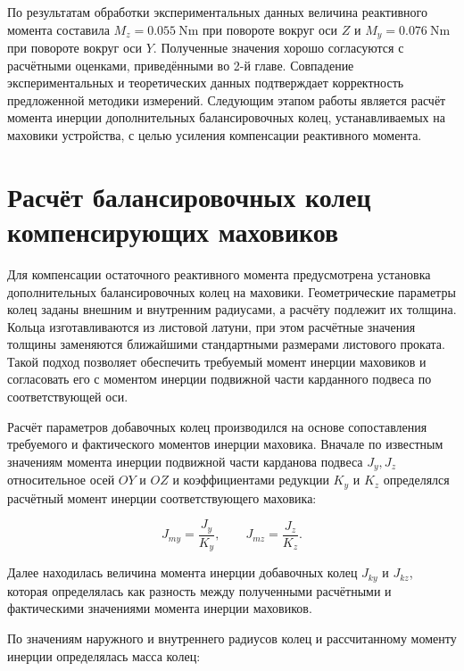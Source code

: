По результатам обработки экспериментальных данных величина реактивного момента составила $M_z = \SI{0,055}{\newton\meter}$ при повороте вокруг оси $Z$ и $M_y = \SI{0,076}{\newton\meter}$ при повороте вокруг оси $Y$. Полученные значения  хорошо согласуются с расчётными оценками, приведёнными во 2-й главе. Совпадение экспериментальных и теоретических данных подтверждает корректность предложенной методики измерений.
Следующим этапом работы является расчёт момента инерции дополнительных балансировочных колец, устанавливаемых на маховики устройства, с целью усиления компенсации реактивного момента.

\section{Расчёт балансировочных колец компенсирующих маховиков}



Для компенсации остаточного реактивного момента предусмотрена установка дополнительных балансировочных колец на маховики. Геометрические параметры колец заданы внешним и внутренним радиусами, а расчёту подлежит их толщина. Кольца изготавливаются из листовой латуни, при этом расчётные значения толщины заменяются ближайшими стандартными размерами листового проката. Такой подход позволяет обеспечить требуемый момент инерции маховиков и согласовать его с моментом инерции подвижной части карданного подвеса по соответствующей оси.




Расчёт параметров добавочных колец производился на основе сопоставления требуемого и фактического моментов инерции маховика. Вначале по известным значениям момента инерции подвижной части карданова подвеса $J_y, J_z$ относительное осей $OY$ и $OZ$ и коэффициентами редукции $K_y$ и $K_z$ определялся расчётный момент инерции соответствующего маховика:

\begin{equation}
	\label{eq:inertia_flywell_calc}
	J_{my} = \frac{J_y}{K_y}, \quad \quad J_{mz}=\frac{J_z}{K_z}.
	\end{equation}
	
Далее находилась величина момента инерции добавочных колец $J_{ky}$ и $J_{kz}$, которая определялась как разность между полученными расчётными и фактическими значениями момента инерции маховиков.

По значениям наружного и внутреннего радиусов колец и рассчитанному моменту инерции определялась масса колец:

